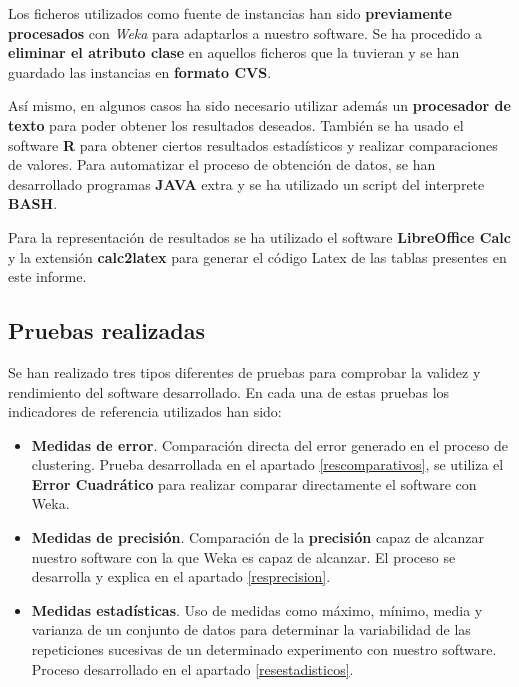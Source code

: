 \documentclass[a4paper]{report}
\begin{document}
	Los ficheros utilizados como fuente de instancias han sido \textbf{previamente procesados} con \textit{Weka} para adaptarlos a nuestro software. Se ha procedido a \textbf{eliminar el atributo clase} en aquellos ficheros que la tuvieran y se han guardado las instancias en \textbf{formato CVS}.
	
	Así mismo, en algunos casos ha sido necesario utilizar además un \textbf{procesador de texto} para poder obtener los resultados deseados. También se ha usado el software \textbf{R} para obtener ciertos resultados estadísticos y realizar comparaciones de valores. Para automatizar el proceso de obtención de datos, se han desarrollado programas \textbf{JAVA} extra y se ha utilizado un script del interprete \textbf{BASH}.
	
	Para la representación de resultados se ha utilizado el software \textbf{LibreOffice Calc} y la extensión \textbf{calc2latex} para generar el código Latex de las tablas presentes en este informe.
	
	\subsection{Pruebas realizadas}
	
	Se han realizado tres tipos diferentes de pruebas para comprobar la validez y rendimiento del software desarrollado. En cada una de estas pruebas los indicadores de referencia utilizados han sido:
	
		\begin{itemize}
			\item	\textbf{Medidas de error}. Comparación directa del error generado en el proceso de clustering. Prueba desarrollada en el apartado \ref{rescomparativos}, se utiliza el \textbf{Error Cuadrático} para realizar comparar directamente el software con Weka.
			
			\item	\textbf{Medidas de precisión}. Comparación de la \textbf{precisión} capaz de alcanzar nuestro software con la que Weka es capaz de alcanzar. El proceso se desarrolla y explica en el apartado \ref{resprecision}.
			
			\item	\textbf{Medidas estadísticas}. Uso de medidas como máximo, mínimo, media y varianza de un conjunto de datos para determinar la variabilidad de las repeticiones sucesivas de un determinado experimento con nuestro software. Proceso desarrollado en el apartado \ref{resestadisticos}.
		\end{itemize}
	
\end{document}
